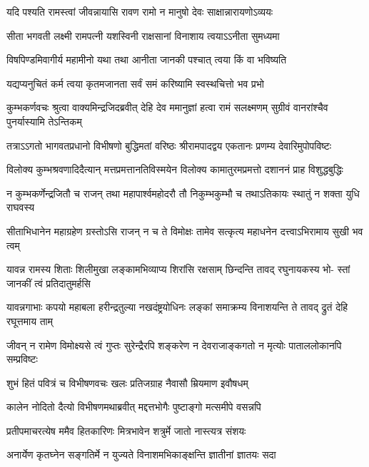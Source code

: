 \twolineshloka
{यदि पश्यति रामस्त्वां जीवन्नायासि रावण}
{रामो न मानुषो देवः साक्षान्नारायणोऽव्ययः} %

\twolineshloka
{सीता भगवती लक्ष्मी रामपत्नी यशस्विनी}
{राक्षसानां विनाशाय त्वयाऽऽनीता सुमध्यमा} %

\twolineshloka
{विषपिण्डमिवागीर्य महामीनो यथा तथा}
{आनीता जानकी पश्चात् त्वया किं वा भविष्यति} %

\twolineshloka
{यद्यप्यनुचितं कर्म त्वया कृतमजानता}
{सर्वं समं करिष्यामि स्वस्थचित्तो भव प्रभो} %

\threelineshloka
{कुम्भकर्णवचः श्रुत्वा वाक्यमिन्द्रजिदब्रवीत्}
{देहि देव ममानुज्ञां हत्वा रामं सलक्ष्मणम्}
{सुग्रीवं वानरांश्चैव पुनर्यास्यामि तेऽन्तिकम्} %

\fourlineindentedshloka
{तत्राऽऽगतो भागवतप्रधानो}
{विभीषणो बुद्धिमतां वरिष्ठः}
{श्रीरामपादद्वय एकतानः}
{प्रणम्य देवारिमुपोपविष्टः} %

\fourlineindentedshloka
{विलोक्य कुम्भश्रवणादिदैत्यान्}
{मत्तप्रमत्तानतिविस्मयेन}
{विलोक्य कामातुरमप्रमत्तो}
{दशाननं प्राह विशुद्धबुद्धिः} %

\fourlineindentedshloka
{न कुम्भकर्णेन्द्रजितौ च राजन्}
{तथा महापार्श्वमहोदरौ तौ}
{निकुम्भकुम्भौ च तथाऽतिकायः}
{स्थातुं न शक्ता युधि राघवस्य} %

\fourlineindentedshloka
{सीताभिधानेन महाग्रहेण}
{ग्रस्तोऽसि राजन् न च ते विमोक्षः}
{तामेव सत्कृत्य महाधनेन}
{दत्त्वाऽभिरामाय सुखी भव त्वम्} %

\fourlineindentedshloka
{यावन्न रामस्य शिताः शिलीमुखा}
{लङ्कामभिव्याप्य शिरांसि रक्षसाम्}
{छिन्दन्ति तावद् रघुनायकस्य भो-}
{स्तां जानकीं त्वं प्रतिदातुमर्हसि} %

\fourlineindentedshloka
{यावन्नगाभाः कपयो महाबला}
{हरीन्द्रतुल्या नखदंष्ट्रयोधिनः}
{लङ्कां समाक्रम्य विनाशयन्ति ते}
{तावद् द्रुतं देहि रघूत्तमाय ताम्} %

\fourlineindentedshloka
{जीवन् न रामेण विमोक्ष्यसे त्वं}
{गुप्तः सुरेन्द्रैरपि शङ्करेण}
{न देवराजाङ्कगतो न मृत्योः}
{पाताललोकानपि सम्प्रविष्टः} %

\twolineshloka
{शुभं हितं पवित्रं च विभीषणवचः खलः}
{प्रतिजग्राह नैवासौ म्रियमाण इवौषधम्} %

\twolineshloka
{कालेन नोदितो दैत्यो विभीषणमथाब्रवीत्}
{मद्दत्तभोगैः पुष्टाङ्गो मत्समीपे वसन्नपि} %

\twolineshloka
{प्रतीपमाचरत्येष ममैव हितकारिणः}
{मित्रभावेन शत्रुर्मे जातो नास्त्यत्र संशयः} %

\twolineshloka
{अनार्येण कृतघ्नेन सङ्गतिर्मे न युज्यते}
{विनाशमभिकाङ्क्षन्ति ज्ञातीनां ज्ञातयः सदा} %

